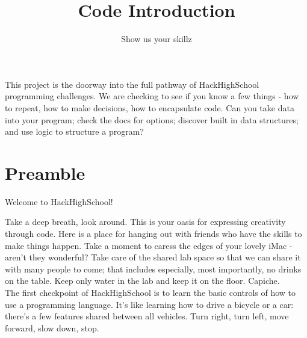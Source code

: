 \documentclass{42-en}
\begin{document}
\title{Code Introduction}
\subtitle{Show us your skillz}


\summary
{
This project is the doorway into the full pathway of HackHighSchool programming challenges. We are checking to see if you know a few things - how to repeat, how to make decisions, how to encapsulate code. Can you take data into your program; check the docs for options; discover built in data structures; and use logic to structure a program?
}

\maketitle

\tableofcontents





\chapter{Preamble}

Welcome to HackHighSchool!

Take a deep breath, look around. This is your oasis for expressing creativity through code. Here is a place for hanging out with 
friends who have the skills to make things happen. Take a moment to caress the edges of your lovely iMac - aren't they wonderful? Take care of the shared lab space so that we can share it with many people to come;
that includes especially, most importantly, no drinks on the table. Keep only water in the lab and keep it on the
floor. Capiche.\\

The first checkpoint of HackHighSchool is to learn the basic controls of how to use a programming language. It's
like learning how to drive a bicycle or a car: there's a few features shared between all vehicles. Turn right,
turn left, move forward, slow down, stop.\\
\end{document}
